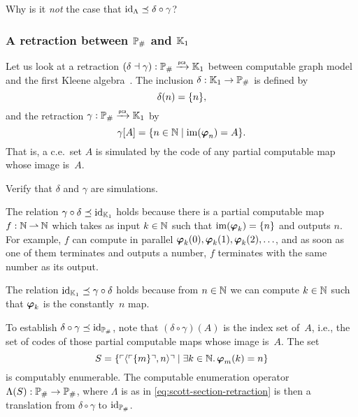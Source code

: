 \begin{exercise}
  Why is it \emph{not} the case that $\id[\Lambda] \preceq \delta \circ \gamma$?
\end{exercise}


\subsubsection{A retraction between $\comp{\Scott}$ and $\klone$}
\label{ex:pcamorphism_K1_RE}%

%

Let us look at a retraction $(\delta \dashv \gamma): \comp{\Scott} \pcato \klone$ between computable graph model and the first Kleene algebra~\cite[Proposition 3.3.7]{Longley:94}.
%
The inclusion $\delta: \klone \to \comp{\Scott}$ is defined by
% 
\begin{equation*}
  \delta(n) = \set{n},
\end{equation*}
% 
and the retraction $\gamma: \comp{\Scott} \pcato \klone$ by
% 
\begin{equation*}
  \gamma[A] = \set{n \in \NN \such \im{\xpr_n} = A}.
\end{equation*}
%
That is, a c.e.~set $A$ is simulated by the code of any partial computable map whose image is~$A$.

\begin{exercise}
  Verify that $\delta$ and $\gamma$ are simulations.
\end{exercise}

The relation $\gamma \circ \delta \preceq \id[\klone]$ holds because there is a partial computable map~$f : \NN \parto \NN$ which takes as input $k \in \NN$ such that $\im{\xpr_k} = \set{n}$ and outputs $n$. For example, $f$ can compute in parallel $\pr{k}{0}, \pr{k}{1}, \pr{k}{2}, \ldots$, and as soon as one of them terminates and outputs a number, $f$ terminates with the same number as its output.

The relation $\id[\klone] \preceq \gamma \circ \delta$ holds because from $n \in \NN$ we can compute $k \in \NN$ such that $\xpr_k$ is the constantly~$n$ map.

To establish $\delta \circ \gamma \preceq \id[\comp{\Scott}]$, note that $(\delta \circ \gamma)(A)$ is the index set of~$A$, i.e., the set of codes of those partial computable maps whose image is~$A$. The set
%
\begin{equation*}
  S = \set{ \code{\pair{\code{\set{m}}, n}} \such \some{k \in \NN} \pr{m}{k} = n }
\end{equation*}
%
is computably enumerable. The computable enumeration operator $\Lambda(S) : \comp{\Scott} \to \comp{\Scott}$, where $\Lambda$ is as in \eqref{eq:scott-section-retraction} is then a translation from $\delta \circ \gamma$ to $\id[\comp{\Scott}]$.

